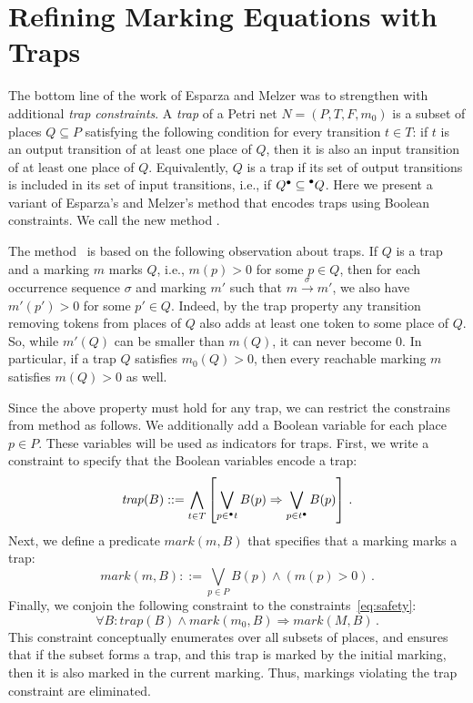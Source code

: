 \section{Refining Marking Equations with Traps}
\label{sec_method_safety_by_refinement}

The bottom line of the work of Esparza and Melzer \cite{EsparzaM00} was to
strengthen \safety{} with additional
\emph{trap constraints}. A {\em trap} of a Petri net $N=(P, T, F, m_0)$ is a subset of places
$Q \subseteq P$ satisfying the following condition for every
transition $t \in T$: if $t$ is an output transition of at least one
place of $Q$, then it is also an input transition of at least one
place of $Q$. Equivalently, $Q$ is a trap if its set of output
transitions is included in its set of input transitions, i.e., if
$Q^{\bullet} \subseteq \prescript{\bullet}{}{Q}$. Here we present a variant of Esparza's and
Melzer's method that encodes traps using Boolean constraints. We
call the new method \safetyref.

The method \safetyref\ is based on the following observation about traps.
If $Q$ is a trap and a marking $m$ marks $Q$, i.e., $m(p) > 0$ for some $p\in Q$,
then for each occurrence sequence $\sigma$ and marking $m'$ such that $m \xrightarrow{\sigma} m'$,
we also have $m'(p') > 0$ for some $p'\in Q$.  
Indeed, by the trap property any transition removing tokens from places of
$Q$ also adds at least one token to some place of $Q$. 
So, while $m'(Q)$ can be smaller than $m(Q)$, it can never become $0$. 
In particular, if a trap $Q$ satisfies $m_0(Q) > 0$, then every
reachable marking $m$ satisfies $m(Q) > 0$ as well.

Since the above property must hold for any trap, we can restrict the constrains
from method \safety{} as follows.
We additionally add a Boolean variable for each place $p\in P$.
These variables will be used as indicators for traps.
First, we write a constraint to specify that the Boolean variables encode a trap:
\[
\mathit{trap}(B) ::= \bigwedge_{t\in T}\left[ \bigvee_{p \in \prescript{\bullet}{}{t}} B(p) \Rightarrow \bigvee_{p\in t^{\bullet}} B(p) \right]\,.
\]
Next, we define a predicate $\mathit{mark}(m, B)$ that specifies that a marking marks a trap:
\[
\mathit{mark}(m, B) ::= \bigvee_{p\in P} B(p)\wedge (m(p) > 0)\,.
\]
Finally, we conjoin the following constraint to the constraints~\eqref{eq:safety}: 
\begin{equation}\label{eq:trap}
\forall B: \mathit{trap}(B) \wedge \mathit{mark}(m_0, B) \Rightarrow \mathit{mark}(M, B)\,.
\end{equation}
%
This constraint conceptually enumerates over all subsets of places, and ensures that if
the subset forms a trap, and this trap is marked by the initial marking, then
it is also marked in the current marking. 
Thus, markings violating the trap constraint are eliminated.

